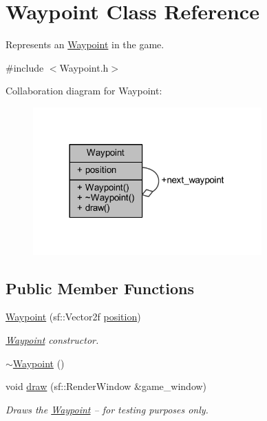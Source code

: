 \hypertarget{class_waypoint}{\section{Waypoint Class Reference}
\label{class_waypoint}
}


Represents an \hyperlink{class_waypoint}{Waypoint} in the game.  




{\ttfamily \#include $<$Waypoint.\+h$>$}



Collaboration diagram for Waypoint\+:
\nopagebreak
\begin{figure}[H]
\begin{center}
\leavevmode
\includegraphics[width=249pt]{class_waypoint__coll__graph}
\end{center}
\end{figure}
\subsection*{Public Member Functions}
\begin{DoxyCompactItemize}
\item 
\hyperlink{class_waypoint_a9574a82849a3e48fce6ea8fae8da0b18}{Waypoint} (sf\+::\+Vector2f \hyperlink{class_waypoint_a17a2e50bca764db9623d8b3ccbdadd70}{position})
\begin{DoxyCompactList}\small\item\em \hyperlink{class_waypoint}{Waypoint} constructor. \end{DoxyCompactList}\item 
\hyperlink{class_waypoint_af87987c65467f66eb3955ba55e50d3db}{$\sim$\+Waypoint} ()
\item 
void \hyperlink{class_waypoint_adf35db1fa2e0667e7b7bc54573b5b287}{draw} (sf\+::\+Render\+Window \&game\+\_\+window)
\begin{DoxyCompactList}\small\item\em Draws the \hyperlink{class_waypoint}{Waypoint} -- for testing purposes only. \end{DoxyCompactList}\end{DoxyCompactItemize}
